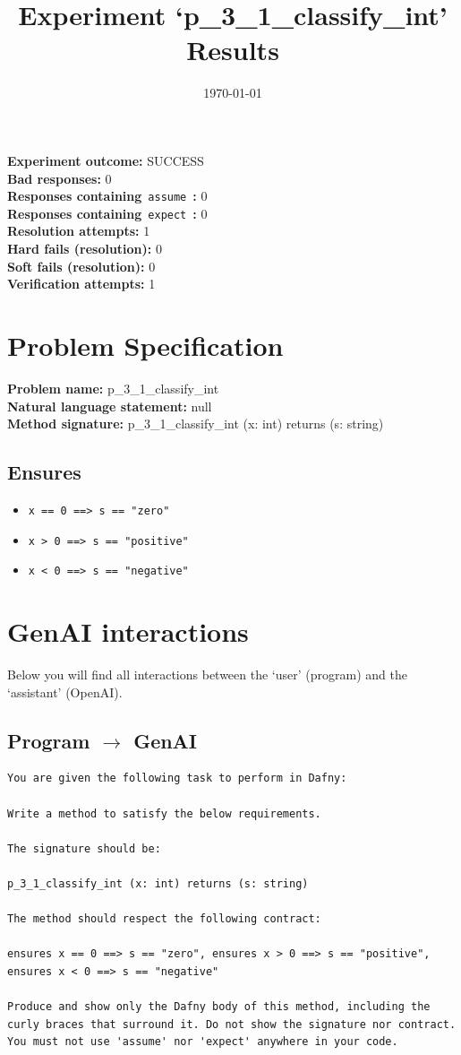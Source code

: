 \documentclass{article}
\begin{document}
\title{Experiment `p\_3\_1\_classify\_int' Results}
\author{\today}
\date{}
\maketitle
\textbf{Experiment outcome: }SUCCESS
\\\textbf{Bad responses: }0
\\\textbf{Responses containing}~\texttt{assume}~\textbf{: }0
\\\textbf{Responses containing}~\texttt{expect}~\textbf{: }0
\\\textbf{Resolution attempts: }1
\\\textbf{Hard fails (resolution): }0
\\\textbf{Soft fails (resolution): }0
\\\textbf{Verification attempts: }1
\section*{Problem Specification}
\textbf{Problem name: }p\_3\_1\_classify\_int
\\\textbf{Natural language statement: }null
\\\textbf{Method signature: }p\_3\_1\_classify\_int (x: int) returns (s: string)
\subsection*{Ensures}
\begin{itemize}
\item \texttt{x == 0 ==> s == "zero"}
\item \texttt{x > 0 ==> s == "positive"}
\item \texttt{x < 0 ==> s == "negative"}
\end{itemize}
\clearpage
\section*{GenAI interactions}
Below you will find all interactions between the `user' (program) and the `assistant' (OpenAI).
\subsection*{Program $\rightarrow$ GenAI}
\begin{lstlisting}
You are given the following task to perform in Dafny:

Write a method to satisfy the below requirements.

The signature should be:

p_3_1_classify_int (x: int) returns (s: string)

The method should respect the following contract:

ensures x == 0 ==> s == "zero", ensures x > 0 ==> s == "positive", ensures x < 0 ==> s == "negative"

Produce and show only the Dafny body of this method, including the curly braces that surround it. Do not show the signature nor contract. You must not use 'assume' nor 'expect' anywhere in your code.
\end{lstlisting}
\end{document}
